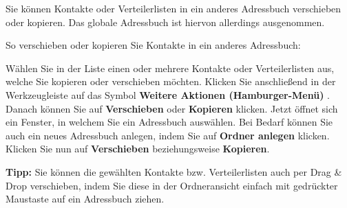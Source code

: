 \documentclass[
  letterpaper,
  DIV=11,
  numbers=noendperiod]{scrreprt}
\begin{document}
Sie können Kontakte oder Verteilerlisten in ein anderes Adressbuch
verschieben oder kopieren. Das globale Adressbuch ist hiervon allerdings
ausgenommen.

So verschieben oder kopieren Sie Kontakte in ein anderes Adressbuch:

Wählen Sie in der Liste einen oder mehrere Kontakte oder Verteilerlisten
aus, welche Sie kopieren oder verschieben möchten. Klicken Sie
anschließend in der Werkzeugleiste auf das Symbol \textbf{Weitere
Aktionen (Hamburger-Menü)} . Danach können Sie auf \textbf{Verschieben}
oder \textbf{Kopieren} klicken. Jetzt öffnet sich ein Fenster, in
welchem Sie ein Adressbuch auswählen. Bei Bedarf können Sie auch ein
neues Adressbuch anlegen, indem Sie auf \textbf{Ordner anlegen} klicken.
Klicken Sie nun auf \textbf{Verschieben} beziehungsweise
\textbf{Kopieren}.

\textbf{Tipp:} Sie können die gewählten Kontakte bzw. Verteilerlisten
auch per Drag \& Drop verschieben, indem Sie diese in der Ordneransicht
einfach mit gedrückter Maustaste auf ein Adressbuch ziehen.
\end{document}
